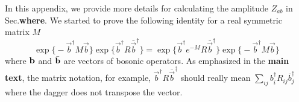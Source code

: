
In this appendix, we provide more details for calculating the amplitude $Z_{ab}$ in Sec.{\bf\color{red}where}. We started to prove the following identity for a real symmetric matrix $M$
\begin{equation}
\label{1st id in app.pf_of_id}
\exp\Big\{- \vec{b}^{\dagger} M \vec{b}  \Big\} \exp \Big\{ \vec{b}^{\dagger} R \bar{\vec{b}}^{\dagger}  \Big\}  = \exp \Big\{ \vec{b}^{\dagger} e^{-M}  R \bar{\vec{b}}^{\dagger}  \Big\} \exp\Big\{- \vec{b}^{\dagger} M \vec{b}  \Big\} 
\end{equation}
where ${\bf b}$ and $\bar{\bf b}$ are vectors of bosonic operators. As emphasized in the {\bf\color{red}main text}, the matrix notation, for example, $\vec{b}^{\dagger} R \bar{\vec{b}}^{\dagger}$ should really mean $\sum_{ij}b^\dagger_iR_{ij}\bar{b}_j^\dagger$ where the dagger does not transpose the vector.  

